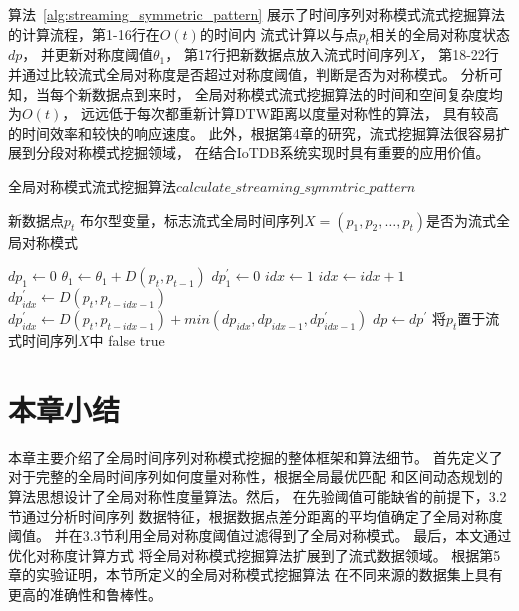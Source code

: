 算法~\ref{alg:streaming_symmetric_pattern}
展示了时间序列对称模式流式挖掘算法
的计算流程，第1-16行在$O(t)$的时间内
流式计算以与点$p_t$相关的全局对称度状态$dp$，
并更新对称度阈值$\theta_1$，
第17行把新数据点放入流式时间序列$X$，
第18-22行
并通过比较流式全局对称度是否超过对称度阈值，判断是否为对称模式。
分析可知，当每个新数据点到来时，
全局对称模式流式挖掘算法的时间和空间复杂度均为$O(t)$，
远远低于每次都重新计算DTW距离以度量对称性的算法，
具有较高的时间效率和较快的响应速度。
此外，根据第4章的研究，流式挖掘算法很容易扩展到分段对称模式挖掘领域，
在结合IoTDB系统实现时具有重要的应用价值。

\renewcommand{\algorithmicrequire}{\textbf{输入：}\unskip}
\renewcommand{\algorithmicensure}{\textbf{输出：}\unskip}

\begin{algorithm}
  \caption{全局对称模式流式挖掘算法$calculate\_streaming\_symmtric\_pattern$}
  \label{alg:streaming_symmetric_pattern}
  \small
  \begin{algorithmic}
    \REQUIRE 新数据点$p_t$
    \ENSURE 布尔型变量，标志流式全局时间序列$X=\left(p_{1},p_{2},\dots,p_t \right)$是否为流式全局对称模式

      \STATE $dp_{1} \leftarrow 0$
    \ELSE
      \STATE $\theta_1 \leftarrow \theta_1+D\left(p_{t}, p_{t-1}\right)$
      \STATE $dp_1^{\prime} \leftarrow 0$
      \STATE $ idx \leftarrow 1$
        \STATE $ idx \leftarrow idx+1$
          \STATE $dp_{idx}^{\prime} \leftarrow D\left(p_{t}, p_{t-idx-1}\right)$
        \ELSE
          \STATE $dp_{idx}^{\prime} \leftarrow D\left(p_{t}, p_{t-idx-1}\right)+min(dp_{idx},dp_{idx-1},dp_{idx-1}^{\prime})$
        \ENDIF
      \ENDWHILE
      \STATE $ dp \leftarrow dp^{\prime}$
    \ENDIF
    \STATE 将$p_t$置于流式时间序列$X$中
      \RETURN false
    \ELSE
      \RETURN true
    \ENDIF
  \end{algorithmic}
\end{algorithm}

\section{本章小结}
本章主要介绍了全局时间序列对称模式挖掘的整体框架和算法细节。
首先定义了对于完整的全局时间序列如何度量对称性，根据全局最优匹配
和区间动态规划的算法思想设计了全局对称性度量算法。然后，
在先验阈值可能缺省的前提下，3.2节通过分析时间序列
数据特征，根据数据点差分距离的平均值确定了全局对称度阈值。
并在3.3节利用全局对称度阈值过滤得到了全局对称模式。
最后，本文通过优化对称度计算方式
将全局对称模式挖掘算法扩展到了流式数据领域。
根据第5章的实验证明，本节所定义的全局对称模式挖掘算法
在不同来源的数据集上具有更高的准确性和鲁棒性。